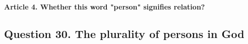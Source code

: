 \documentclass{ucetd}
\begin{document}
\paragraph{Article 4. Whether this word "person" signifies relation?}
\subsection{Question 30. The plurality of persons in God}
\end{document}
